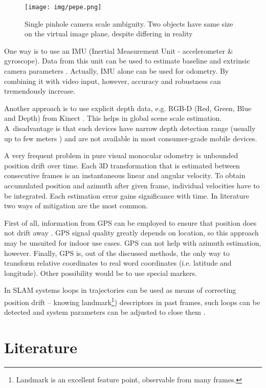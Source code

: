 \begin{figure}[ht]
	\centering\texttt{[image: img/pepe.png]}
	\caption{Single pinhole camera scale ambiguity. Two objects have same size on the virtual image plane, despite differing in reality}
	\label{fig:pepe}
\end{figure}

One way is to use an IMU (Inertial Measurement Unit - accelerometer \& gyroscope). Data from this unit can be used to estimate baseline and extrinsic camera parameters \cite{tracked_vehicles}. Actually, IMU alone can be used for odometry. By combining it with video input, however, accuracy and robustness can tremendously increase.

Another approach is to use explicit depth data, e.g. RGB-D (Red, Green, Blue and Depth) from Kinect \cite{yu2013improved}. This helps in global scene scale estimation. A~disadvantage is that such devices have narrow depth detection range (usually up to few meters \cite{accuracy_and_resoulution}) and are not available in most consumer-grade mobile devices.

A very frequent problem in pure visual monocular odometry is unbounded position drift over time. Each 3D transformation that is estimated between consecutive frames is an instantaneous linear and angular velocity. To obtain accumulated position and azimuth after given frame, individual velocities have to be integrated. Each estimation error gains significance with time. In literature two ways of mitigation are the most common.

First of all, information from GPS can be employed to ensure that position does not drift away \cite{accurate_global_localization}. GPS signal quality greatly depends on location, so this approach may be unsuited for indoor use cases. GPS can not help with azimuth estimation, however. Finally, GPS is, out of the discussed methods, the only way to transform relative coordinates to real word coordinates (i.e. latitude and longitude). Other possibility would be to use special markers.

In SLAM systems loops in trajectories can be used as means of correcting position drift -- knowing landmark\footnote{Landmark is an excellent feature point, observable from many frames.}) descriptors in past frames, such loops can be detected and system parameters can be adjusted to close them \cite{the_application_of_kalman} \cite{monoslam}.



\section{Literature}
\label{sec:stateoftheart}


